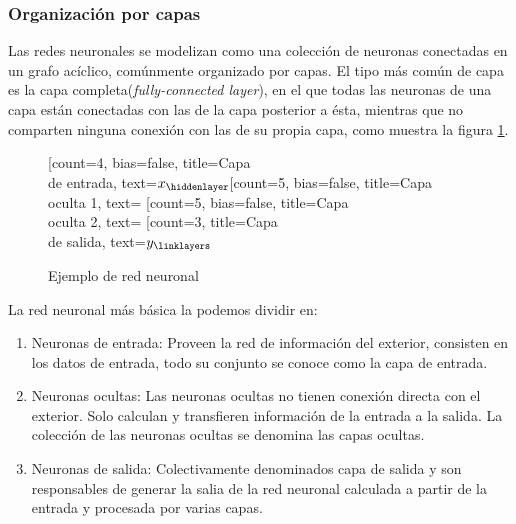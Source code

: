 \documentclass[12,twoside]{TFG-GM}
\theoremstyle{definition}
\theoremstyle{remark}
\begin{document}
\subsubsection{Organización por capas}
Las redes neuronales se modelizan como una colección de neuronas conectadas en un grafo acíclico, comúnmente organizado por capas. El tipo más común de capa es la capa completa(\textit{fully-connected layer}), en el que todas las neuronas de una capa están conectadas con las de la capa posterior a ésta, mientras que no comparten ninguna conexión con las de su propia capa, como muestra la figura \ref{fig:red neuronal}. %
\begin{figure}
\begin{center}
\begin{neuralnetwork}[height=4]
		\newcommand{\nodetextclear}[2]{}
		\newcommand{\nodetextx}[2]{$x_#2$}
		\newcommand{\nodetexty}[2]{$y_#2$}
		[count=4, bias=false, title=Capa \\de entrada, text=\nodetextx]
		\hiddenlayer[count=5, bias=false, title=Capa \\ oculta 1, text=\nodetextclear] \linklayers
		\hiddenlayer[count=5, bias=false, title=Capa \\ oculta 2, text=\nodetextclear] \linklayers
		\outputlayer[count=3, title=Capa\\ de salida, text=\nodetexty] \linklayers
	
	\end{neuralnetwork}
	
\end{center}
\caption{Ejemplo de red neuronal \label{fig:red neuronal}}
\end{figure}
La red neuronal más básica la podemos dividir en: 
\begin{enumerate}
\item Neuronas de entrada: Proveen la red de información del exterior, consisten en los datos de entrada, todo su conjunto se conoce como la capa de entrada. 
\item Neuronas ocultas: Las neuronas ocultas no tienen conexión directa con el exterior. Solo calculan y transfieren información de la entrada a la salida. La colección de las neuronas ocultas se denomina las capas ocultas.
\item Neuronas de salida: Colectivamente denominados capa de salida y son responsables de generar la salia de la red neuronal calculada a partir de la entrada y procesada por varias capas. 
\end{enumerate}
\end{document}
